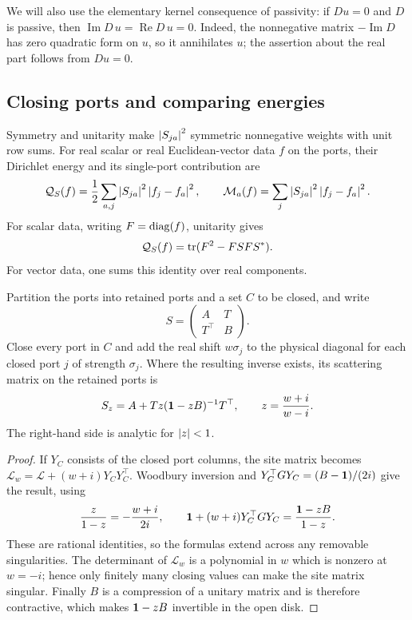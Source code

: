 We will also use the elementary kernel consequence of passivity: if
$Du=0$ and $D$ is passive, then
$\operatorname{Im}D\,u=\operatorname{Re}D\,u=0$. Indeed, the nonnegative
matrix $-\operatorname{Im}D$ has zero quadratic form on $u$, so it
annihilates $u$; the assertion about the real part follows from $Du=0$.

\subsection{Closing ports and comparing energies}

Symmetry and unitarity make $\left\lvert S_{ja}\right\rvert^2$ symmetric nonnegative
weights with unit row sums. For real scalar or real Euclidean-vector
data $f$ on the ports, their Dirichlet energy and its single-port
contribution are
\begin{equation}
 \mathcal Q_S(f)=\frac12\sum_{a,j}\left\lvert S_{ja}\right\rvert^2\left\lvert f_j-f_a\right\rvert^2,
 \qquad
 \mathcal M_a(f)=\sum_j\left\lvert S_{ja}\right\rvert^2\left\lvert f_j-f_a\right\rvert^2.
 \label{mat:energies}
\end{equation}
For scalar data, writing $F=\operatorname{diag}(f)$, unitarity gives
\begin{equation}
 \mathcal Q_S(f)=\operatorname{tr}(F^2-FSFS^*).
 \label{mat:energy-trace}
\end{equation}
For vector data, one sums this identity over real components.

\begin{lemma}\label{mat:closure}
Partition the ports into retained ports and a set $C$ to be closed, and
write
\[
 S=\begin{pmatrix}A&T\\T^\top&B\end{pmatrix}.
\]
Close every port in $C$ and add the real shift $w\sigma_j$ to the
physical diagonal for each closed port $j$ of strength $\sigma_j$.
Where the resulting inverse exists, its scattering matrix on the
retained ports is
\begin{equation}
 S_z=A+Tz(\mathbf 1-zB)^{-1}T^\top,
 \qquad z=\frac{w+i}{w-i}.
 \label{mat:closure-formula}
\end{equation}
The right-hand side is analytic for $\left\lvert z\right\rvert<1$.
\end{lemma}

\begin{proof}
If $Y_C$ consists of the closed port columns, the site matrix becomes
$\mathscr L_w=\mathscr L+(w+i)Y_CY_C^\top$. Woodbury inversion and
$Y_C^\top GY_C=(B-\mathbf 1)/(2i)$ give the result, using
\[
 \frac{z}{1-z}=-\frac{w+i}{2i},\qquad
 \mathbf 1+(w+i)Y_C^\top GY_C=\frac{\mathbf 1-zB}{1-z}.
\]
These are rational identities, so the formulas extend across any
removable singularities. The determinant of $\mathscr L_w$ is a
polynomial in $w$ which is nonzero at $w=-i$; hence only finitely many
closing values can make the site matrix singular. Finally $B$ is a
compression of a unitary matrix and is therefore contractive, which
makes $\mathbf 1-zB$ invertible in the open disk.
\end{proof}

